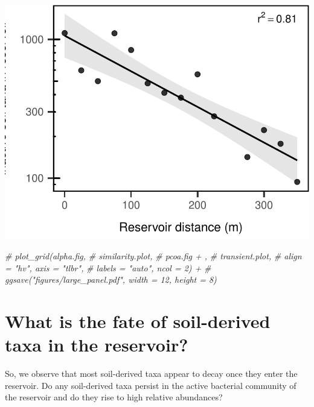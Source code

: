 \documentclass[]{article}
\newenvironment{Shaded}{\begin{snugshade}}{\end{snugshade}}
\newcommand{\CommentTok}[1]{\textcolor[rgb]{0.56,0.35,0.01}{\textit{#1}}}
\begin{document}
\begin{center}\includegraphics{ReservoirGradient_files/figure-latex/plot_transient-1} \end{center}

\begin{Shaded}
\begin{Highlighting}[]
\CommentTok{# plot_grid(alpha.fig, }
\CommentTok{#           similarity.plot, }
\CommentTok{#           pcoa.fig + , }
\CommentTok{#           transient.plot,}
\CommentTok{#           align = "hv", axis = "tlbr",}
\CommentTok{#           labels = "auto", ncol = 2) +}
\CommentTok{#   ggsave("figures/large_panel.pdf", width = 12, height = 8)}
\end{Highlighting}
\end{Shaded}

\hypertarget{what-is-the-fate-of-soil-derived-taxa-in-the-reservoir}{%
\section{What is the fate of soil-derived taxa in the
reservoir?}\label{what-is-the-fate-of-soil-derived-taxa-in-the-reservoir}}

So, we observe that most soil-derived taxa appear to decay once they
enter the reservoir. Do any soil-derived taxa persist in the active
bacterial community of the reservoir and do they rise to high relative
abundances?
\end{document}
